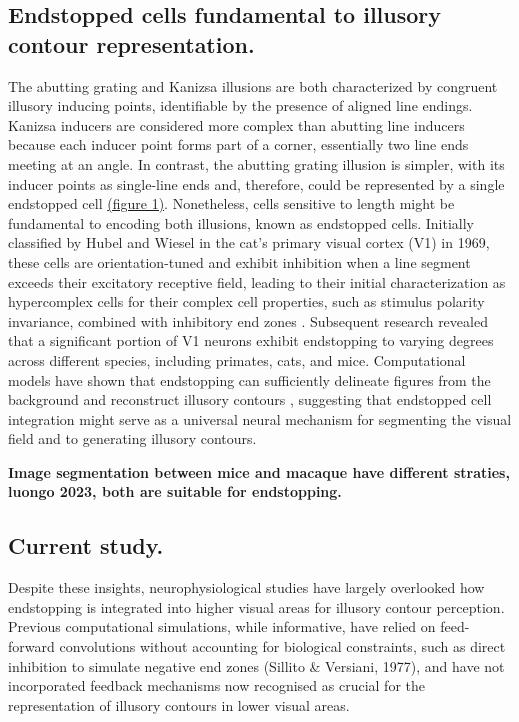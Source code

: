 \documentclass[12pt]{article}
\begin{document}
\bigbreak
\subsection{Endstopped cells fundamental to illusory contour representation.}
The abutting grating and Kanizsa illusions are both characterized by congruent illusory inducing points, identifiable by the presence of aligned line endings. Kanizsa inducers are considered more complex than abutting line inducers because each inducer point forms part of a corner, essentially two line ends meeting at an angle. In contrast, the abutting grating illusion is simpler, with its inducer points as single-line ends and, therefore, could be represented by a single endstopped cell \hyperref[fig:figure_1]{(figure 1)}.
Nonetheless, cells sensitive to length might be fundamental to encoding both illusions, known as endstopped cells. Initially classified by Hubel and Wiesel in the cat's primary visual cortex (V1) in 1969, these cells are orientation-tuned and exhibit inhibition when a line segment exceeds their excitatory receptive field, leading to their initial characterization as hypercomplex cells for their complex cell properties, such as stimulus polarity invariance, combined with inhibitory end zones \autocite{hubelRECEPTIVEFIELDSFUNCTIONAL1965}. Subsequent research revealed that a significant portion of V1 neurons exhibit endstopping to varying degrees  \autocite{deangelisLengthWidthTuning1994,jonesSurroundSuppressionPrimate2001,sceniakVisualSpatialCharacterization2001} across different species, including primates, cats, and mice. Computational models have shown that endstopping can sufficiently delineate figures from the background and reconstruct illusory contours \autocite{vonderheydtMechanismsContourPerception1989}, suggesting that endstopped cell integration might serve as a universal neural mechanism for segmenting the visual field and to generating illusory contours.

\textbf{Image segmentation between mice and macaque have different straties, luongo 2023, both are suitable for endstopping.}



\bigbreak
\subsection{Current study.}
Despite these insights, neurophysiological studies have largely overlooked how endstopping is integrated into higher visual areas for illusory contour perception. Previous computational simulations, while informative, have relied on feed-forward convolutions without accounting for biological constraints, such as direct inhibition to simulate negative end zones (Sillito \& Versiani, 1977), and have not incorporated feedback mechanisms now recognised as crucial for the representation of illusory contours in lower visual areas.
\end{document}
